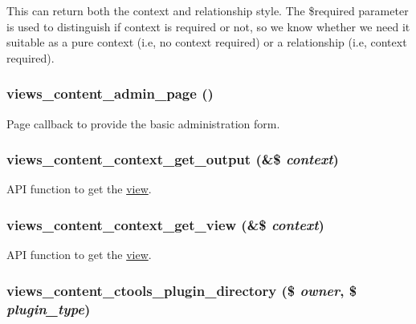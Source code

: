 This can return both the context and relationship style. The \$required parameter is used to distinguish if context is required or not, so we know whether we need it suitable as a pure context (i.e, no context required) or a relationship (i.e, context required). \hypertarget{views__content_8module_af58660a89e1278c2017a52d9419cb041}{
\subsubsection[{views\_\-content\_\-admin\_\-page}]{\setlength{\rightskip}{0pt plus 5cm}views\_\-content\_\-admin\_\-page ()}}
\label{views__content_8module_af58660a89e1278c2017a52d9419cb041}
Page callback to provide the basic administration form. \hypertarget{views__content_8module_ae13ab6888acce2fe7a74aa935ab2422c}{
\subsubsection[{views\_\-content\_\-context\_\-get\_\-output}]{\setlength{\rightskip}{0pt plus 5cm}views\_\-content\_\-context\_\-get\_\-output (\&\$ {\em context})}}
\label{views__content_8module_ae13ab6888acce2fe7a74aa935ab2422c}
API function to get the \hyperlink{classview}{view}. \hypertarget{views__content_8module_a456bb2978f9dc8b22cde2975cb417a6a}{
\subsubsection[{views\_\-content\_\-context\_\-get\_\-view}]{\setlength{\rightskip}{0pt plus 5cm}views\_\-content\_\-context\_\-get\_\-view (\&\$ {\em context})}}
\label{views__content_8module_a456bb2978f9dc8b22cde2975cb417a6a}
API function to get the \hyperlink{classview}{view}. \hypertarget{views__content_8module_ad80b6f3ed37ac841a555f303d0bc0175}{
\subsubsection[{views\_\-content\_\-ctools\_\-plugin\_\-directory}]{\setlength{\rightskip}{0pt plus 5cm}views\_\-content\_\-ctools\_\-plugin\_\-directory (\$ {\em owner}, \/  \$ {\em plugin\_\-type})}}
